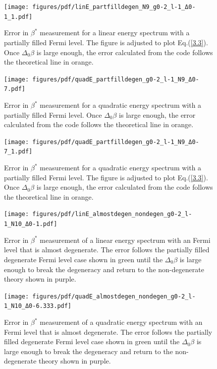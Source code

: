 \begin{figure}[H]
    \centering
    \texttt{[image: figures/pdf/linE\_partfilldegen\_N9\_g0-2\_l-1\_Δ0-1\_1.pdf]}
    \caption{Error in $\beta^*$ measurement for a linear energy spectrum with a partially filled Fermi level. The figure is adjusted to plot Eq.\@ (\ref{3.3}). Once $\Delta_0\beta$ is large enough, the error calculated from the code follows the theoretical line in orange.}
    \label{fig:PartiallyFilledDegenerateLinearSpectrumAdjustedError}
\end{figure}
\begin{figure}[H]
    \centering
    \texttt{[image: figures/pdf/quadE\_partfilldegen\_g0-2\_l-1\_N9\_Δ0-7.pdf]}
    \caption{Error in $\beta^*$ measurement for a quadratic energy spectrum with a partially filled Fermi level. Once $\Delta_0\beta$ is large enough, the error calculated from the code follows the theoretical line in orange.}
    \label{fig:PartiallyFilledDegenerateQuadraticSpectrumError}
\end{figure}
\begin{figure}[H]
    \centering
    \texttt{[image: figures/pdf/quadE\_partfilldegen\_g0-2\_l-1\_N9\_Δ0-7\_1.pdf]}
    \caption{Error in $\beta^*$ measurement for a quadratic energy spectrum with a partially filled Fermi level. The figure is adjusted to plot Eq.\@ (\ref{3.3}). Once $\Delta_0\beta$ is large enough, the error calculated from the code follows the theoretical line in orange.}
    \label{fig:PartiallyFilledDegenerateQuadraticSpectrumAdjustedError}
\end{figure}
\begin{figure}[H]
    \centering
    \texttt{[image: figures/pdf/linE\_almostdegen\_nondegen\_g0-2\_l-1\_N10\_Δ0-1.pdf]}
    \caption{Error in $\beta^*$ measurement of a linear energy spectrum with an Fermi level that is almost degenerate. The error follows the partially filled degenerate Fermi level case shown in green until the $\Delta_0 \beta$ is large enough to break the degeneracy and return to the non-degenerate theory shown in purple.}
    \label{fig:linE_almostdegen}
\end{figure}
\begin{figure}[H]
    \centering
    \texttt{[image: figures/pdf/quadE\_almostdegen\_nondegen\_g0-2\_l-1\_N10\_Δ0-6.333.pdf]}
    \caption{Error in $\beta^*$ measurement of a quadratic energy spectrum with an Fermi level that is almost degenerate. The error follows the partially filled degenerate Fermi level case shown in green until the $\Delta_0 \beta$ is large enough to break the degeneracy and return to the non-degenerate theory shown in purple.}
    \label{fig:quadE_almostdegen}
\end{figure}
